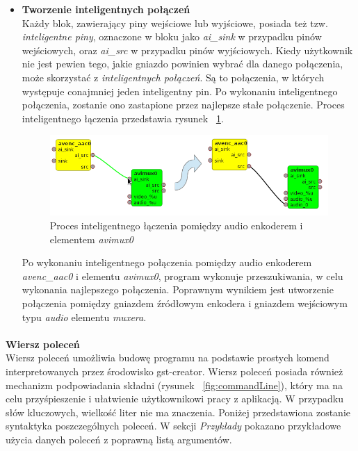 \documentclass[12pt]{article}
\begin{document}
\begin{itemize}
\item \textbf{Tworzenie inteligentnych połączeń} \\
Każdy blok, zawierający piny wejściowe lub wyjściowe, posiada też tzw. \textit{inteligentne piny}, oznaczone w bloku jako \textit{ai\_sink} w przypadku pinów wejściowych, oraz \textit{ai\_src} w przypadku pinów wyjściowych. Kiedy użytkownik nie jest pewien tego, jakie gniazdo powinien wybrać dla danego połączenia, może skorzystać z \textit{inteligentnych połączeń}. Są to połączenia, w których występuje conajmniej jeden inteligentny pin. Po wykonaniu inteligentnego połączenia, zostanie ono zastapione przez najlepsze stałe połączenie. Proces inteligentnego łączenia przedstawia rysunek ~\ref{fig:aiConnectionProcess}. 
\begin{figure}[H]
  \includegraphics[width=150mm]{img/ai-connection-process.png}
  \caption{Proces inteligentnego łączenia pomiędzy audio enkoderem i elementem \textit{avimux0}}
  \label{fig:aiConnectionProcess}
\end{figure}
Po wykonaniu inteligentnego połączenia pomiędzy audio enkoderem \textit{avenc\_aac0} i elementu \textit{avimux0}, program wykonuje przeszukiwania, w celu wykonania najlepszego połączenia. Poprawnym wynikiem jest utworzenie połączenia pomiędzy gniazdem źródłowym enkodera i gniazdem wejściowym typu \textit{audio} elementu \textit{muxera}.
\end{itemize}\paragraph{}\vspace{-3mm}
\textbf{Wiersz poleceń} \\
Wiersz poleceń umożliwia budowę programu na podstawie prostych komend interpretowanych przez środowisko gst-creator. Wiersz poleceń posiada również mechanizm podpowiadania składni (rysunek ~\ref{fig:commandLine}), który ma na celu przyśpieszenie i ułatwienie użytkownikowi pracy z aplikacją. W przypadku słów kluczowych, wielkość liter nie ma znaczenia. Poniżej przedstawiona zostanie syntaktyka poszczególnych poleceń. W sekcji \textit{Przykłady} pokazano przykładowe użycia danych poleceń z poprawną listą argumentów. 
\end{document}
